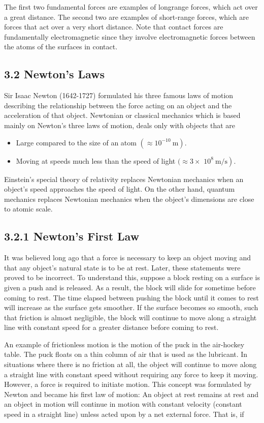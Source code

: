 \documentclass[10pt]{article}
\begin{document}
The first two fundamental forces are examples of longrange forces, which act over a great distance. The second two are examples of short-range forces, which are forces that act over a very short distance. Note that contact forces are fundamentally electromagnetic since they involve electromagnetic forces between the atoms of the surfaces in contact.

\subsection*{3.2 Newton's Laws}
Sir Isaac Newton (1642-1727) formulated his three famous laws of motion describing the relationship between the force acting on an object and the acceleration of that object. Newtonian or classical mechanics which is based mainly on Newton's three laws of motion, deals only with objects that are

\begin{itemize}
  \item Large compared to the size of an atom $\left(\approx 10^{-10} \mathrm{~m}\right)$.
  \item Moving at speeds much less than the speed of light $(\approx 3 \times$ $\left.10^{8} \mathrm{~m} / \mathrm{s}\right)$.
\end{itemize}

Einstein's special theory of relativity replaces Newtonian mechanics when an object's speed approaches the speed of light. On the other hand, quantum mechanics replaces Newtonian mechanics when the object's dimensions are close to atomic scale.

\subsection*{3.2.1 Newton's First Law}
It was believed long ago that a force is necessary to keep an object moving and that any object's natural state is to be at rest. Later, these statements were proved to be incorrect. To understand this, suppose a block resting on a surface is given a push and is released. As a result, the block will slide for sometime before coming to rest. The time elapsed between pushing the block until it comes to rest will increase as the surface gets smoother. If the surface becomes so smooth, such that friction is almost negligible, the block will continue to move along a straight line with constant speed for a greater distance before coming to rest.

An example of frictionless motion is the motion of the puck in the air-hockey table. The puck floats on a thin column of air that is used as the lubricant. In situations where there is no friction at all, the object will continue to move along a straight line with constant speed without requiring any force to keep it moving. However, a force is required to initiate motion. This concept was formulated by Newton and became his first law of motion: An object at rest remains at rest and an object in motion will continue in motion with constant velocity (constant speed in a straight line) unless acted upon by a net external force. That is, if
\end{document}
